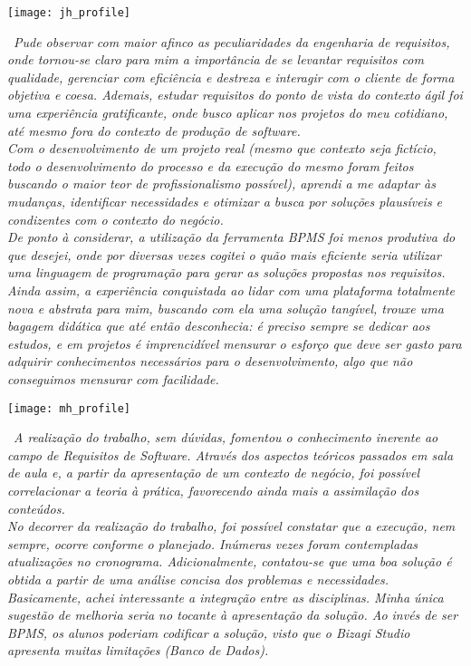 \newpage
\vspace*{\fill}
\begin{center}
	\texttt{[image: jh\_profile]}
\end{center}
\vspace*{\fill}
\ \indent \emph{Pude observar com maior afinco as peculiaridades da engenharia de requisitos, onde tornou-se claro para mim a importância de se levantar requisitos com qualidade, gerenciar com eficiência e destreza e interagir com o cliente de forma objetiva e coesa. Ademais, estudar requisitos do ponto de vista do contexto ágil foi uma experiência gratificante, onde busco aplicar nos projetos do meu cotidiano, até mesmo fora do contexto de produção de software.}
\\ \indent \emph{Com o desenvolvimento de um projeto real (mesmo que contexto seja fictício, todo o desenvolvimento do processo e da execução do mesmo foram feitos buscando o maior teor de profissionalismo possível), aprendi a me adaptar às mudanças, identificar necessidades e otimizar a busca por soluções plausíveis e condizentes com o contexto do negócio.}
\\ \indent \emph{De ponto à considerar, a utilização da ferramenta BPMS foi menos produtiva do que desejei, onde por diversas vezes cogitei o quão mais eficiente seria utilizar uma linguagem de programação para gerar as soluções propostas nos requisitos. Ainda assim, a experiência conquistada ao lidar com uma plataforma totalmente nova e abstrata para mim, buscando com ela uma solução tangível, trouxe uma bagagem didática que até então desconhecia: é preciso sempre se dedicar aos estudos, e em projetos é imprencidível mensurar o esforço que deve ser gasto para adquirir conhecimentos necessários para o desenvolvimento, algo que não conseguimos mensurar com facilidade.}

\newpage
\vspace*{\fill}
\begin{center}
	\texttt{[image: mh\_profile]}
\end{center}
\ \indent \emph{A realização do trabalho, sem dúvidas, fomentou o conhecimento inerente ao campo de Requisitos de Software. Através dos aspectos teóricos passados em sala de aula e, a partir da apresentação de um contexto de negócio, foi possível correlacionar a teoria à prática, favorecendo ainda mais a assimilação dos conteúdos.}
\\ \indent \emph{No decorrer da realização do trabalho, foi possível constatar que a execução, nem sempre, ocorre conforme o planejado. Inúmeras vezes foram contempladas atualizações no cronograma. Adicionalmente, contatou-se que uma boa solução é obtida a partir de uma análise concisa dos problemas e necessidades.}
\\ \indent \emph{Basicamente, achei interessante a integração entre as disciplinas. Minha única sugestão de melhoria seria no tocante à apresentação da solução. Ao invés de ser BPMS, os alunos poderiam codificar a solução, visto que o Bizagi Studio apresenta muitas limitações (Banco de Dados).}
\vspace*{\fill}

